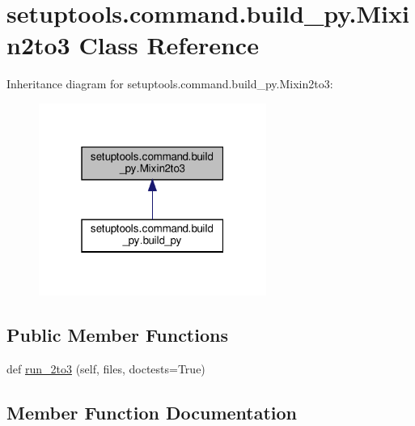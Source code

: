 \hypertarget{classsetuptools_1_1command_1_1build__py_1_1Mixin2to3}{}\section{setuptools.\+command.\+build\+\_\+py.\+Mixin2to3 Class Reference}
\label{classsetuptools_1_1command_1_1build__py_1_1Mixin2to3}


Inheritance diagram for setuptools.\+command.\+build\+\_\+py.\+Mixin2to3\+:
\nopagebreak
\begin{figure}[H]
\begin{center}
\leavevmode
\includegraphics[width=211pt]{classsetuptools_1_1command_1_1build__py_1_1Mixin2to3__inherit__graph}
\end{center}
\end{figure}
\subsection*{Public Member Functions}
\begin{DoxyCompactItemize}
\item 
def \hyperlink{classsetuptools_1_1command_1_1build__py_1_1Mixin2to3_a65bba09b327f28d7a1dbfbc15bff3017}{run\+\_\+2to3} (self, files, doctests=True)
\end{DoxyCompactItemize}


\subsection{Member Function Documentation}
\mbox{\label{classsetuptools_1_1command_1_1build__py_1_1Mixin2to3_a65bba09b327f28d7a1dbfbc15bff3017}} 
